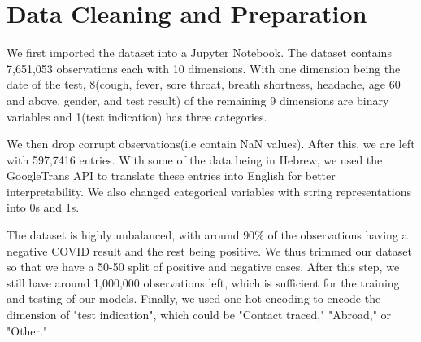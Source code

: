 \documentclass[a4paper, 11pt]{article}
\begin{document}
\section*{Data Cleaning and Preparation}
We first imported the dataset into a Jupyter Notebook. The dataset contains 7,651,053 observations each with 10 dimensions. With one dimension being the date of the test, 8(cough, fever, sore throat, breath shortness, headache, age 60 and above, gender, and test result) of the remaining 9 dimensions are binary variables and 1(test indication) has three categories. \par
We then drop corrupt observations(i.e contain NaN values). After this, we are left with 597,7416 entries. With some of the data being in Hebrew, we used the GoogleTrans API to translate these entries into English for better interpretability. We also changed categorical variables with string representations into 0s and 1s. \par
The dataset is highly unbalanced, with around $90\%$ of the observations having a negative COVID result and the rest being positive. We thus trimmed our dataset so that we have a 50-50 split of positive and negative cases. After this step, we still have around 1,000,000 observations left, which is sufficient for the training and testing of our models.
Finally, we used one-hot encoding to encode the dimension of "test indication", which could be "Contact traced," "Abroad," or "Other."
\end{document}
